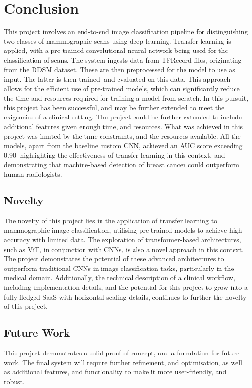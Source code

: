 \documentclass[../main]{subfiles}
\begin{document}
\chapter{Conclusion}
This project involves an end-to-end image classification pipeline for distinguishing two classes of mammographic scans using deep learning. Transfer learning is applied, with a pre-trained convolutional neural network being used for the classification of scans. The system ingests data from TFRecord files, originating from the DDSM dataset. These are then preprocessed for the model to use as input. The latter is then trained, and evaluated on this data. This approach allows for the efficient use of pre-trained models, which can significantly reduce the time and resources required for training a model from scratch. In this pursuit, this project has been successful, and may be further extended to meet the exigencies of a clinical setting. The project could be further extended to include additional features given enough time, and resources. What was achieved in this project was limited by the time constraints, and the resources available. All the models, apart from the baseline custom CNN, achieved an AUC score exceeding 0.90, highlighting the effectiveness of transfer learning in this context, and demonstrating that machine-based detection of breast cancer could outperform human radiologists.

\section{Novelty}
The novelty of this project lies in the application of transfer learning to mammographic image classification, utilising pre-trained models to achieve high accuracy with limited data. The exploration of transformer-based architectures, such as ViT, in conjunction with CNNs, is also a novel approach in this context. The project demonstrates the potential of these advanced architectures to outperform traditional CNNs in image classification tasks, particularly in the medical domain. Additionally, the technical description of a clinical workflow, including implementation details, and the potential for this project to grow into a fully fledged SaaS with horizontal scaling details, continues to further the novelty of this project.

\section{Future Work}
This project demonstrates a solid proof-of-concept, and a foundation for future work. The final system will require further refinement, and optimisation, as well as additional features, and functionality to make it more user-friendly, and robust.
\end{document}
